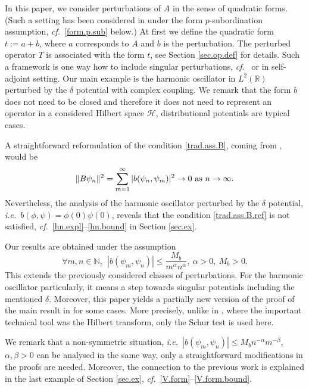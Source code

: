 In this paper, we consider perturbations of $A$ in the sense of quadratic forms. (Such a setting has been considered in \cite{Agranovich-1994-28} under the form $p$-subordination assumption, {\emph{cf.}}~\eqref{form.p.sub} below.)
At first we define the quadratic form $t:=a+b$, where $a$ corresponds to $A$ and $b$ is the perturbation. The perturbed operator $T$ is associated with the form $t$, see Section \ref{sec.op.def} for details. Such a framework is one way how to include singular perturbations, {\emph{cf.}}~\cite[Chap.VI.3.-4.]{Kato-1966} or \cite[\S.1.]{Simon-1971-21} in self-adjoint setting. Our main example is the harmonic oscillator in $L^2({{\mathbb{R}}})$ perturbed by the $\delta$ potential with complex coupling.  
We remark that the form $b$ does not need to be closed and therefore it does not need to represent an operator in a considered Hilbert space ${{\mathcal{H}}}$, distributional potentials are typical cases. 

A straightforward reformulation of the condition \eqref{trad.ass.B}, coming from \cite{Adduci-2012-10, Adduci-2012-73, Shkalikov-2010-269}, would be 
\begin{equation*}\label{trad.ass.B.ref}
\|B\psi_n\|^2 = \sum_{m=1}^{\infty} |b(\psi_n, \psi_m)|^2 \rightarrow 0 \ {\rm as} \ n \rightarrow \infty.
\end{equation*}
Nevertheless, the analysis of the harmonic oscillator perturbed by the $\delta$ potential, {{\emph{i.e.}}}~$b(\phi,\psi)=\phi(0) \overline{\psi(0)} $, reveals that the condition \eqref{trad.ass.B.ref} is not satisfied, {\emph{cf.}}~\eqref{hn.expl}--\eqref{hn.bound} in Section \ref{sec.ex}.

Our results are obtained under the assumption
\begin{equation}\label{ass.b}
\forall m,n \in {\mathbb{N}}, \ \ |b(\psi_m,\psi_n)| \leq \frac{M_b}{m^{\alpha} n^{\alpha}},  \ \alpha >0, \ M_b >0.
\end{equation}
This extends the previously considered classes of perturbations. For the harmonic oscillator particularly, it means a step towards singular potentials including the mentioned $\delta$. Moreover,  this paper yields a partially new version of the proof of the main result in \cite{Adduci-2012-10} for some cases. More precisely, unlike in \cite{Adduci-2012-10, Adduci-2012-73}, where the important technical tool was the Hilbert transform, only the Schur test is used here.

We remark that a non-symmetric situation, {{\emph{i.e.}}}~$|b(\psi_m,\psi_n)| \leq M_b n^{-\alpha}m^{-\beta}$, $\alpha, \beta >0$ can be analysed in the same way, only a straightforward modifications in the proofs are needed. Moreover, the connection to the previous work \cite{Adduci-2012-10} 
is explained in the last example of Section \ref{sec.ex}, {\emph{cf.}}~\eqref{V.form}--\eqref{V.form.bound}.

